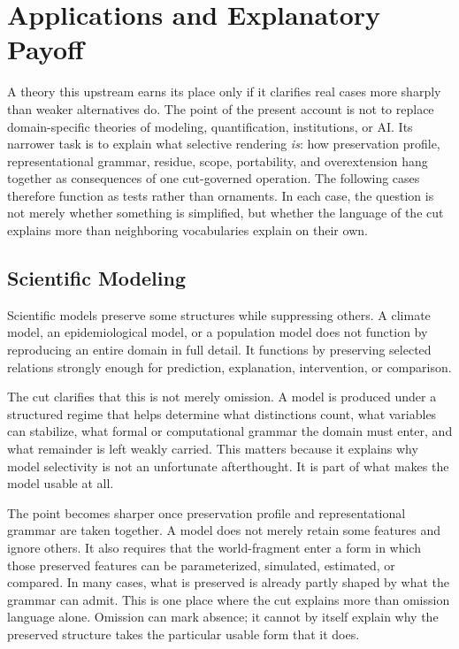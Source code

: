 \documentclass[11pt]{article}
\renewcommand{\emph}[1]{\textit{#1}}
\begin{document}
\section{Applications and Explanatory Payoff}

A theory this upstream earns its place only if it clarifies real cases more sharply than weaker alternatives do. The point of the present account is not to replace domain-specific theories of modeling, quantification, institutions, or AI. Its narrower task is to explain what selective rendering \emph{is}: how preservation profile, representational grammar, residue, scope, portability, and overextension hang together as consequences of one cut-governed operation. The following cases therefore function as tests rather than ornaments. In each case, the question is not merely whether something is simplified, but whether the language of the cut explains more than neighboring vocabularies explain on their own.

\subsection{Scientific Modeling}

Scientific models preserve some structures while suppressing others. A climate model, an epidemiological model, or a population model does not function by reproducing an entire domain in full detail. It functions by preserving selected relations strongly enough for prediction, explanation, intervention, or comparison. \cite{frigg_hartmann_models_sep,frigg_nguyen_scientific_representation_sep}

The cut clarifies that this is not merely omission. A model is produced under a structured regime that helps determine what distinctions count, what variables can stabilize, what formal or computational grammar the domain must enter, and what remainder is left weakly carried. This matters because it explains why model selectivity is not an unfortunate afterthought. It is part of what makes the model usable at all.

The point becomes sharper once preservation profile and representational grammar are taken together. A model does not merely retain some features and ignore others. It also requires that the world-fragment enter a form in which those preserved features can be parameterized, simulated, estimated, or compared. In many cases, what is preserved is already partly shaped by what the grammar can admit. This is one place where the cut explains more than omission language alone. Omission can mark absence; it cannot by itself explain why the preserved structure takes the particular usable form that it does.
\end{document}
